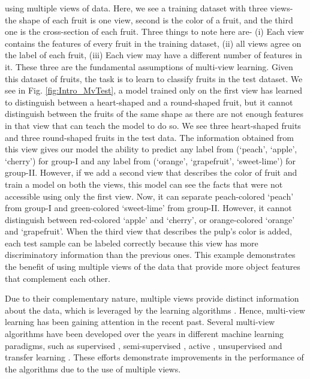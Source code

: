 \clearpage

\noindent
using multiple views of data. Here, we see a training dataset with three views- the shape of each fruit is one view, second is the color of a fruit, and the third one is the cross-section of each fruit. Three things to note here are- (i) Each view contains the features of every fruit in the training dataset, (ii) all views agree on the label of each fruit, (iii) Each view may have a different number of features in it. These three are the fundamental assumptions of multi-view learning. Given this dataset of fruits, the task is to learn to classify fruits in the test dataset. We see in Fig. \ref{fig:Intro_MvTest}, a model trained only on the first view has learned to distinguish between a heart-shaped and a round-shaped fruit, but it cannot distinguish between the fruits of the same shape as there are not enough features in that view that can teach the model to do so. We see three heart-shaped fruits and three round-shaped fruits in the test data. The information obtained from this view gives our model the ability to predict any label from (`peach', `apple', `cherry') for group-I and any label from (`orange', `grapefruit', `sweet-lime') for group-II. However, if we add a second view that describes the color of fruit and train a model on both the views, this model can see the facts that were not accessible using only the first view. Now, it can separate peach-colored `peach' from group-I and green-colored `sweet-lime' from group-II. However, it cannot distinguish between red-colored `apple' and `cherry', or orange-colored `orange' and `grapefruit'. When the third view that describes the pulp's color is added, each test sample can be labeled correctly because this view has more discriminatory information than the previous ones. This example demonstrates the benefit of using multiple views of the data that provide more object features that complement each other.

Due to their complementary nature, multiple views provide distinct information about the data, which is leveraged by the learning algorithms \cite{ZhaoXXS17, Sun13}. Hence, multi-view learning has been gaining attention in the recent past. Several multi-view algorithms have been developed over the years in different machine learning paradigms, such as supervised \cite{KanSZLC16,SunXY15,SharmaKDJ12,LiZLZ19}, semi-supervised \cite{ChaoS19,SunJ11}, active \cite{YuKRR11,SunH10}, unsupervised \cite{KumarD11,HouthuysLS18,KumarRD11} and transfer learning \cite{ChenWB11,XuS11}. These efforts demonstrate improvements in the performance of the algorithms due to the use of multiple views.

